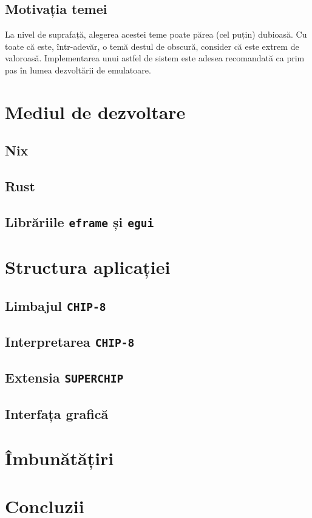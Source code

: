 \documentclass[a4paper]{article}
\begin{document}
\subsection{Motivația temei}
La nivel de suprafață, alegerea acestei teme poate părea (cel puțin) dubioasă. Cu toate că este, într-adevăr, o temă destul de obscură, consider
că este extrem de valoroasă. Implementarea unui astfel de sistem este adesea recomandată ca prim pas în lumea dezvoltării de emulatoare\cite{langhoff}.

\section{Mediul de dezvoltare}
\subsection{Nix}
\subsection{Rust}
\subsection{Librăriile \texttt{eframe} și \texttt{egui}}

\section{Structura aplicației}
\subsection{Limbajul \texttt{CHIP-8}}
\subsection{Interpretarea \texttt{CHIP-8}}
\subsection{Extensia \texttt{SUPERCHIP}}
\subsection{Interfața grafică}

\section{Îmbunătățiri}

\section{Concluzii}

\newpage
\printbibliography[title=\section{Bibliografie}]
\end{document}
